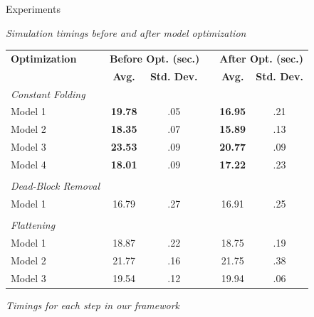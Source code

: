 \documentclass[final,hyperref={pdfpagelabels=false}]{beamer}
\begin{document}
\begin{frame}{}
\begin{columns}[t,totalwidth=\linewidth]
\begin{column}{.585\linewidth}
      \end{column}
\vspace{0.1cm}
     \begin{column}{.4\linewidth}
             \begin{block}{Experiments}

             \begin{table}[h]
             \footnotesize \textit{Simulation timings before and after model optimization}\\
             \centering
             \begin{tabular}{l | c c p{1cm} c c }
             
             \textbf{Optimization} &\multicolumn{2}{c}{\textbf{Before Opt. (sec.)}}& &\multicolumn{2}{c}{\textbf{After Opt. (sec.)}} \\
              & \textbf{Avg.} & \textbf{Std. Dev.} && \textbf{Avg.} &\textbf{Std. Dev.}\\\hline
              
             \textit{Constant Folding} & & & & & \\
             Model 1 & \textbf{19.78} &.05 && \textbf{16.95} & .21\\
             Model 2 & \textbf{18.35} & .07 &&\textbf{ 15.89} & .13\\
             Model 3 &\textbf{ 23.53} & .09 && \textbf{20.77} & .09\\
             Model 4 & \textbf{18.01} & .09 && \textbf{17.22} & .23\\
              & & && & \\
             \textit{Dead-Block Removal} & && & & \\
             Model 1 & 16.79 & .27 && 16.91 & .25\\
              & & && & \\
             \textit{Flattening} & & && & \\
             Model 1 & 18.87 & .22 && 18.75 & .19\\
             Model 2 & 21.77 & .16 && 21.75 & .38\\
             Model 3 & 19.54 & .12 && 19.94 & .06\\
             
             \end{tabular}
             \centering
             
             \end{table}
             
             \begin{table}[h]
             \footnotesize \textit{Timings for each step in our framework}\\
	          \centering
	          \begin{tabular}{l | c c }
	          

\end{tabular}
\end{table}
\end{block}
\end{column}
\end{columns}
\end{frame}
\end{document}
